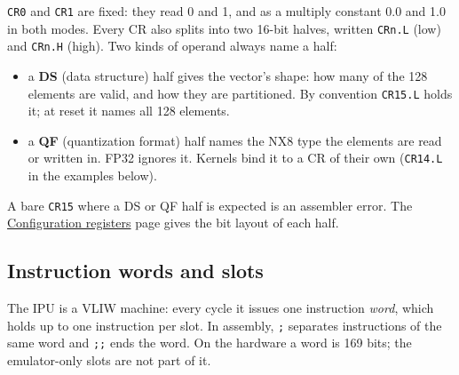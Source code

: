 \documentclass[11pt,a4paper]{article}
\newcommand{\doc}[2]{\href{https://rechefe.github.io/ipu-emulator/dev/#1/}{\textcolor{accent}{#2}}}
\begin{document}
\texttt{CR0} and \texttt{CR1} are fixed: they read 0 and 1, and as a multiply
constant 0.0 and 1.0 in both modes. Every CR also splits into two 16-bit
halves, written \texttt{CRn.L} (low) and \texttt{CRn.H} (high). Two kinds of
operand always name a half:

\begin{itemize}
\item a \textbf{DS} (data structure) half gives the vector's shape: how many
  of the 128 elements are valid, and how they are partitioned. By convention
  \texttt{CR15.L} holds it; at reset it names all 128 elements.
\item a \textbf{QF} (quantization format) half names the NX8 type the elements
  are read or written in. FP32 ignores it. Kernels bind it to a CR of their
  own (\texttt{CR14.L} in the examples below).
\end{itemize}

A bare \texttt{CR15} where a DS or QF half is expected is an assembler error.
The \doc{reference/isa/configuration-registers}{Configuration registers} page
gives the bit layout of each half.

\subsection{Instruction words and slots}

The IPU is a VLIW machine: every cycle it issues one instruction \emph{word},
which holds up to one instruction per slot. In assembly, \texttt{;} separates
instructions of the same word and \texttt{;;} ends the word. On the hardware a
word is 169 bits; the emulator-only slots are not part of it.
\end{document}
